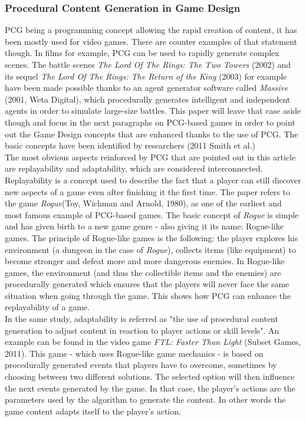\subsubsection{Procedural Content Generation in Game Design}

PCG being a programming concept allowing the rapid creation of content, it has been mostly used for video games. There are counter examples of that statement though. In films for example, PCG can be used to rapidly generate complex scenes. The battle scenes \textit{The Lord Of The Rings: The Two Towers} (2002) and its sequel \textit{The Lord Of The Rings: The Return of the King} (2003) for example have been made possible thanks to an agent generator software called \textit{Massive} (2001, Weta Digital), which procedurally generates intelligent and independent agents in order to simulate large-size battles. This paper will leave that case aside though and focus in the next paragraphs on PCG-based games in order to point out the Game Design concepts that are enhanced thanks to the use of PCG. The basic concepts have been identified by researchers (2011 Smith et al.)\\
The most obvious aspects reinforced by PCG that are pointed out in this article are replayability and adaptability, which are considered interconnected.\\
Replayability is a concept used to describe the fact that a player can still discover new aspects of a game even after finishing it the first time. The paper refers to the game \textit{Rogue}(Toy, Wichman and Arnold, 1980), as one of the earliest and most famous example of PCG-based games. The basic concept of \textit{Rogue} is simple and has given birth to a new game genre - also giving it its name: Rogue-like games. The principle of Rogue-like games is the following: the player explores his environment (a dungeon in the case of \textit{Rogue}), collects items (like equipment) to become stronger and defeat more and more dangerous enemies. In Rogue-like games, the environment (and thus the collectible items and the enemies) are procedurally generated which ensures that the players will never face the same situation when going through the game. This shows how PCG can enhance the replayability of a game.\\ 
In the same study, adaptability is referred as "the use of procedural content generation to adjust content in reaction to player actions or skill levels". An example can be found in the video game \textit{FTL: Faster Than Light} (Subset Games, 2011). This game - which uses Rogue-like game mechanics - is based on procedurally generated events that players   have to overcome, sometimes by choosing between two different solutions. The selected option will then influence the next events generated by the game. In that case, the player's actions are the parameters used by the algorithm to generate the content. In other words the game content adapts itself to the player's action.\\
